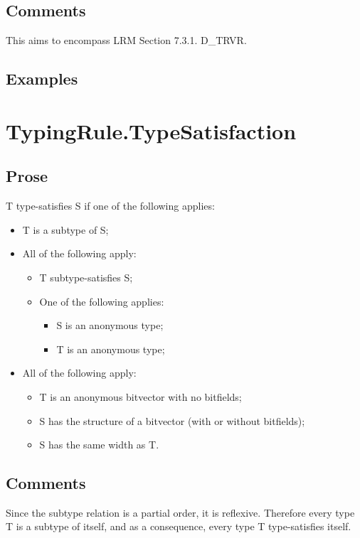 \documentclass{book}
\begin{document}
\subsection{Comments}
  This aims to encompass LRM Section 7.3.1. D\_TRVR.

\subsection{Examples}

\section{TypingRule.TypeSatisfaction}

\subsection{Prose}
 
 T type-satisfies S if one of the following applies:
 \begin{itemize}
 \item  T is a subtype of S;
 \item  All of the following apply:
    \begin{itemize}
    \item  T subtype-satisfies S;
    \item  One of the following applies:
      \begin{itemize}
      \item  S is an anonymous type;
      \item  T is an anonymous type;
      \end{itemize}
    \end{itemize}
  \item  All of the following apply:
    \begin{itemize}
    \item  T is an anonymous bitvector with no bitfields;
    \item  S has the structure of a bitvector (with or without bitfields);
    \item  S has the same width as T.
    \end{itemize}
  \end{itemize}

\subsection{Comments}
  Since the subtype relation is a partial order, it is reflexive. Therefore
  every type T is a subtype of itself, and as a consequence, every type T
  type-satisfies itself.
  
\end{document}
